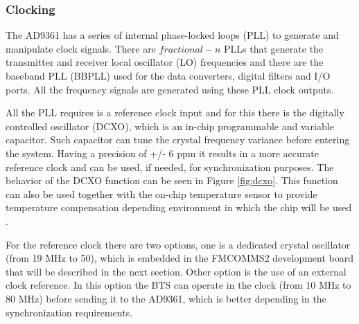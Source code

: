 
\subsubsection{Clocking}

The AD9361 has a series of internal phase-locked loops (PLL) to generate and
manipulate clock signals. There are $fractional-n$ PLLs that generate the
transmitter and receiver local oscillator (LO) frequencies and there are the
baseband PLL (BBPLL) used for the data converters, digital filters and I/O
ports. All the frequency signals are generated using these PLL clock outputs.

All the PLL requires is a reference clock input and for this there is the
digitally controlled oscillator (DCXO), which is an in-chip programmable and
variable capacitor. Such capacitor can tune the crystal frequency variance
before entering the system. Having a precision of +/- 6 ppm it results in a more
accurate reference clock and can be used, if needed, for synchronization
purposes. The behavior of the DCXO function can be seen in Figure
\ref{fig:dcxo}. This function can also be used together with the on-chip
temperature sensor to provide temperature compensation depending environment in
which the chip will be used \cite{ad:ad9361}.

For the reference clock there are two options, one is a dedicated crystal
oscillator (from 19 MHz to 50), which is embedded in the FMCOMMS2 development
board that will be described in the next section. Other option is the use of an
external clock reference. In this option the BTS can operate in the clock (from
10 MHz to 80 MHz) before sending it to the AD9361, which is better depending in
the synchronization requirements.

%
%
%

